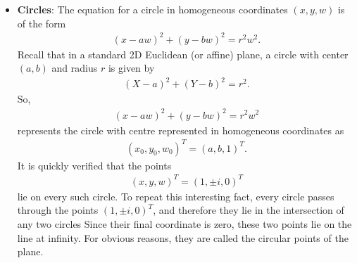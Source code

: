 \documentclass{report}
\begin{document}
\begin{itemize}
\begin{itemize}
                \item \textbf{All lines intersect:} Every pair of distinct lines meets at a single point, so parallel lines do not exist.
                \item \textbf{No direction vectors:} Because lines that used to be parallel now meet on the line at infinity, lines no longer have a distinct direction or slope.
                \item \textbf{No "betweenness" (linear order):} Because a projective line is closed like a circle (wrapping around through a point at infinity), you cannot say point \(B\) lies "between" \(A\) and \(C\) without knowing which direction around the loop you are traveling.
                \item \textbf{No area or volume}: Since lengths and angles can stretch arbitrarily under perspective, shapes have no fixed area.
            \end{itemize}
        \item \textbf{Circles}: The equation for a circle in homogeneous coordinates $(x, y, w)$ is of the form
            \begin{align*}
                (x- aw)^{2} + (y-bw)^{2} = r^{2}w^{2}
            .\end{align*}
            Recall that in a standard 2D Euclidean (or affine) plane, a circle with center $(a,b)$ and radius $r$ is given by
            \begin{align*}
                (X - a)^{2} + (Y-b)^{2} = r^{2}
            .\end{align*}
            So, 
            \begin{align*}
                (x- aw)^{2} + (y-bw)^{2} = r^{2}w^{2}
            \end{align*}
            represents the circle with centre represented in homogeneous coordinates as
            \begin{align*}
                (x_{0}, y_{0}, w_{0})^{T} = (a,b,1)^{T}
            .\end{align*}
            It is quickly verified that the points
            \begin{align*}
                (x,y,w)^{T} = (1, \pm i, 0)^{T}
            \end{align*}
            lie on every such circle. To repeat this interesting fact, every circle passes through the points $(1, \pm i, 0)^{T}$, and therefore they lie in the intersection of any two circles
            \bigbreak \noindent 
            Since their final coordinate is zero, these two points lie on the line at infinity. For obvious reasons, they are called the circular points of the plane.

\end{itemize}
\end{document}
